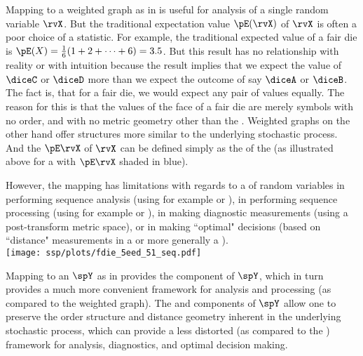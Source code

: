 Mapping to a weighted graph as in  
is useful for analysis of a single random variable $\rvX$.
But the traditional expectation value $\pE(\rvX)$ of $\rvX$ is often a poor choice of a statistic.
For example, the traditional expected value of a fair die is $\pE(X)=\frac{1}{6}(1+2+\cdots+6)=3.5$.
But this result has no relationship with reality or with intuition because the result implies that we expect 
the value of $\diceC$ or $\diceD$ more than we expect the outcome of say $\diceA$ or $\diceB$.
The fact is, that for a fair die, we would expect any pair of values equally.
The reason for this is that the values of the face of a fair die are merely symbols with no order, 
and with no metric geometry other than the .
Weighted graphs on the other hand offer structures more similar to the underlying stochastic process.
And the  $\pE\rvX$ 
of $\rvX$ can be defined simply as the  of the  %
(as illustrated above for a  with $\pE\rvX$ shaded in blue). %

However, the mapping has limitations with regards to a  of random variables in 
performing sequence analysis (using for example  or ),
in performing sequence processing (using for example  or ),
in making   diagnostic measurements (using a post-transform metric space),
or in making ``optimal" decisions 
(based on ``distance" measurements in a  or more generally a ).  %
\\\indentx\texttt{[image: ssp/plots/fdie\_5eed\_51\_seq.pdf]}

Mapping to an  $\spY$ as in 
provides the  component of $\spY$,
which in turn provides a much more convenient framework for  analysis and processing
(as compared to the weighted graph).
The  and  components of $\spY$ allow one to preserve the 
order structure and distance geometry inherent in the underlying %
stochastic process, which can provide a less distorted (as compared to the )
framework for analysis, diagnostics, and optimal decision making. %

